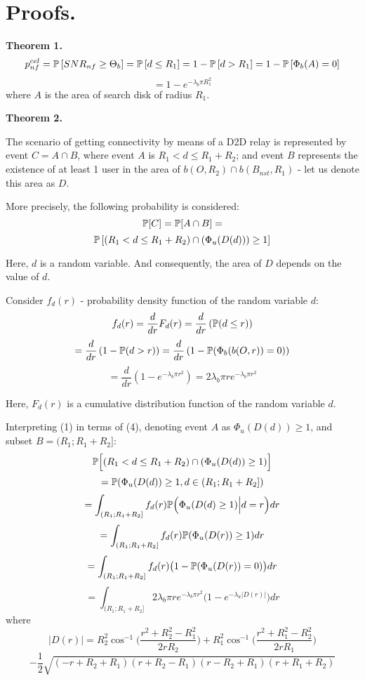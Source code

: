 \newpage
\appendix
\section {Proofs.}

\begin {framed}
{\bf Theorem 1.}
	\[p_{nf}^{cel}=\P\left[SNR_{nf}\ge\Theta_b\right]=\P\left[d\le R_1\right]=1-\P\left[d>R_1\right]=1-\P\left[\Phi_b(A)=0\right]\]
	\[=1-e^{-\lambda_b\pi R_1^2}\]
where \(A\) is the area of search disk of radius \(R_1\).
\end {framed}

\begin {framed}
{\bf Theorem 2.}
    \par The scenario of getting connectivity by means of a D2D relay is represented by event $C=A\cap B$, where event $A$ is $R_1<d\le R_1+R_2$; and event $B$ represents the existence of at least 1 user in the area of $b(O,R_2)\cap b(B_{nst},R_1)$ - let us denote this area as $D$.
	\par More precisely, the following probability is considered:
	$$\P[C]=\P[A\cap B]=$$
	\begin{equation}
	    \P\left[(R_1<d\le R_1+R_2)\cap (\Phi_u(D(d)))\ge 1\right]
	\end{equation}
	\par Here, $d$ is a random variable. And consequently, the area of $D$ depends on the value of $d$.
	\par Consider $f_d(r)$ - probability density function of the random variable $d$:
	$$f_d(r)=\frac{d}{dr}F_d(r)=\frac{d}{dr}\left(\P(d\le r)\right)$$
	$$=\frac{d}{dr}\left(1-\P(d>r)\right)=\frac{d}{dr}\left(1-\P(\Phi_b(b(O,r))=0)\right)$$
	$$=\frac{d}{dr}\left(1-e^{-\lambda_b\pi r^2}\right)=2\lambda_b\pi re^{-\lambda_b\pi r^2}$$
	\par Here, $F_d(r)$ is a cumulative distribution function of the random variable $d$.
	\par Interpreting (1) in terms of (4), denoting event $A$ as ${\Phi_u(D(d))\ge1}$, and subset $B=(R_1;R_1+R_2]$:
	$$\P\Big[(R_1<d\le R_1+R_2)\cap (\Phi_u(D(d))\ge 1)\Big]$$
	$$=\P({\Phi_u(D(d))\ge1},d\in (R_1;R_1+R_2])$$
	$$=\int_{(R_1;R_1+R_2]}f_d(r)\P\Big(\Phi_u(D(d)\ge1)\Big|d=r\Big)dr$$
	$$=\int_{(R_1;R_1+R_2]}f_d(r)\P(\Phi_u(D(r))\ge1)dr$$
	$$=\int_{(R_1;R_1+R_2]}f_d(r)\big(1-\P(\Phi_u(D(r))=0)\big)dr$$
	\begin{equation}
	    =\int_{(R_1;R_1+R_2]}2\lambda_b\pi re^{-\lambda_b\pi r^2}\Big(1-e^{-\lambda_u|D(r)|}\Big)dr
	\end{equation}
	where
	$$|D(r)|=R_2^2\cos^{-1}\Big(\frac{r^2+R_2^2-R_1^2}{2rR_2}\Big)+R_1^2\cos^{-1}\Big(\frac{r^2+R_1^2-R_2^2}{2rR_1}\Big)$$
	$$-\frac{1}{2}\sqrt{(-r+R_2+R_1)(r+R_2-R_1)(r-R_2+R_1)(r+R_1+R_2)}$$
\end {framed}

